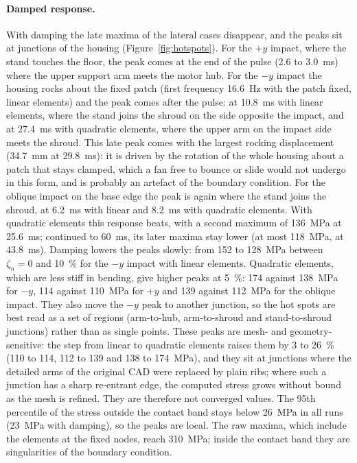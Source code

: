 \documentclass[11pt]{article}
\begin{document}
\paragraph{Damped response.} With damping the late maxima of the lateral cases disappear, and the peaks sit at junctions
of the housing (Figure~\ref{fig:hotspots}). For the $+y$ impact, where the stand touches the floor, the peak comes at
the end of the pulse (2.6 to \SI{3.0}{ms}) where the upper support arm meets the motor hub. For the $-y$ impact the
housing rocks about the fixed patch (first frequency \SI{16.6}{Hz} with the patch fixed, linear elements) and the peak
comes after the pulse: at \SI{10.8}{ms} with linear elements, where the stand joins the shroud on the side opposite the
impact, and at \SI{27.4}{ms} with quadratic elements, where the upper arm on the impact side meets the shroud. This
late peak comes with the largest rocking displacement (\SI{34.7}{mm} at \SI{29.8}{ms}): it is driven by the rotation of
the whole housing about a patch that stays clamped, which a fan free to bounce or slide would not undergo in this
form, and is probably an artefact of the boundary condition. For the
oblique impact on the base edge the peak is again where the stand joins the shroud, at \SI{6.2}{ms} with linear and
\SI{8.2}{ms} with quadratic elements. With quadratic elements this response beats, with a second maximum of
\SI{136}{MPa} at \SI{25.6}{ms}; continued to \SI{60}{ms}, its later maxima stay lower (at most \SI{118}{MPa}, at
\SI{43.8}{ms}). Damping lowers the peaks slowly: from 152 to \SI{128}{MPa}
between $\zeta_n=0$ and \SI{10}{\%} for the $-y$ impact with linear elements. Quadratic elements, which are less stiff in bending,
give higher peaks at \SI{5}{\%}: 174 against \SI{138}{MPa} for $-y$, 114 against \SI{110}{MPa} for $+y$ and 139
against \SI{112}{MPa} for the oblique impact. They also move the $-y$ peak to another junction, so the hot spots are
best read as a set of regions (arm-to-hub, arm-to-shroud and stand-to-shroud junctions) rather than as single points.
These peaks are mesh- and geometry-sensitive: the step from linear to quadratic elements raises them by 3 to
\SI{26}{\%} (110 to 114, 112 to 139 and 138 to \SI{174}{MPa}), and they sit at junctions where the detailed arms of
the original CAD were replaced by plain ribs; where such a junction has a sharp re-entrant edge, the computed stress
grows without bound as the mesh is refined. They are therefore not converged values.
The 95th percentile of the stress outside the contact band stays below \SI{26}{MPa} in all runs (\SI{23}{MPa} with
damping), so the peaks are local. The raw maxima, which include the elements at the fixed nodes, reach
\SI{310}{MPa}; inside the contact band they are singularities of the boundary condition.
\end{document}
